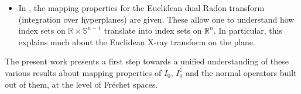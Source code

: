 \documentclass[JEP,XML,SOM,Unicode,NoFloatCountersInSection, NoEqCountersInSection,published]{cedram}
\def\To#1{\mathchoice{\xrightarrow{\textstyle\kern4pt#1\kern3pt}}{\stackrel{#1}{\longrightarrow}}{}{}}
\theoremstyle{plain}
\theoremstyle{definition}
\theoremstyle{remark}
\def\Sm{\mathbb{S}}
\def\Rm{{\mathbb{R}}}
\newcommand{\adj}{I_0^\sharp}
\newcommand{\wtH}{\widetilde{H}}
\begin{document}
\begin{itemize}
\begin{equation*}
\adj \, \mu^{-1} I_0 \colon \wtH^k(M) \To{\cong} \wtH^{k+1}(M).
\end{equation*}
In other words, by introducing the singular weight $\sfrac{1}{\mu}$, one can identify spaces which are stable under iteration of the modified
normal operator $\adj \, \mu^{-1} I_0$.
\item In \cite{Katsevich2001}, the mapping properties for the Euclidean dual Radon transform (\ie integration over hyperplanes) are given.
These allow one to understand how index sets on $\Rm\times \Sm^{n-1}$ translate into index sets on $\Rm^n$. In particular, this explains
much about the Euclidean X-ray transform on the plane.
\end{itemize}

The present work presents a first step towards a unified understanding of these various results about mapping properties of $I_0$, $\adj $
and the normal operators built out of them, at the level of Fréchet spaces.
\end{document}
